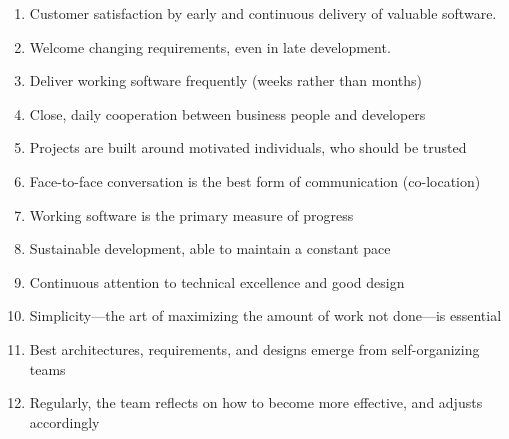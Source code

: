 \begin{enumerate}
      \item Customer satisfaction by early and continuous delivery of valuable software.
      \item Welcome changing requirements, even in late development.
      \item Deliver working software frequently (weeks rather than months)
      \item Close, daily cooperation between business people and developers
      \item Projects are built around motivated individuals, who should be trusted
      \item Face-to-face conversation is the best form of communication (co-location)
      \item Working software is the primary measure of progress
      \item Sustainable development, able to maintain a constant pace
      \item Continuous attention to technical excellence and good design
      \item Simplicity—the art of maximizing the amount of work not done—is essential
      \item Best architectures, requirements, and designs emerge from self-organizing teams
      \item Regularly, the team reflects on how to become more effective, and adjusts accordingly
\end{enumerate}
